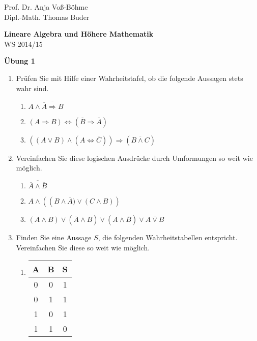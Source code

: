 \documentclass[12pt,a4paper]{scrreprt}
\begin{document}
 
\begin{flushleft}
Prof. Dr.  Anja Voß-Böhme \\
Dipl.-Math. Thomas Buder
\end{flushleft}

\begin{center}{\large\bf Lineare Algebra und Höhere Mathematik} \\ WS 2014/15 \end{center}

\begin{center}{\large\bf Übung 1 } 
\end{center}


\bigskip
\begin{enumerate}

 	\item 	Prüfen Sie mit Hilfe einer Wahrheitstafel, ob die folgende Aussagen stets wahr sind.

	\begin{enumerate}
	 	\item   $A \wedge \overline{\overline{A} \Rightarrow B} $
		\item   $(A \Rightarrow B) \Leftrightarrow ( \overline{B} \Rightarrow \overline{A}) $
		\item   $\left( (A \vee B) \wedge ( A \Leftrightarrow \overline{C})\right)  \Rightarrow ( \overline{B \wedge C}) $
	\end{enumerate}

	\item Vereinfachen Sie diese logischen Ausdrücke durch Umformungen so weit wie möglich.
	
	\begin{enumerate}
		\item   $\overline{ \overline{A} \wedge \overline{B}}$
	 	\item   $A \wedge \left( \left(B \wedge \overline{A}) \vee (C \wedge B) \right)$
		\item $(A \wedge B) \vee (\overline{A} \wedge B) \vee (A \wedge \overline{B}) \vee \overline{ A \vee  B}$
	\end{enumerate}
	
 	\item Finden Sie eine Aussage $S$, die folgenden Wahrheitstabellen entspricht. Vereinfachen Sie diese so weit wie möglich.

\begin{center}

	\begin{enumerate}
		\item
			\begin{tabular}{c c | c}
				A & B & S \\
				\hline 
				0	&0	&1 \\
				0	&1	&1 \\
				1	&0	&1 \\
				1	&1	&0 
			\end{tabular}


\end{enumerate}
\end{center}
\end{enumerate}
\end{document}
